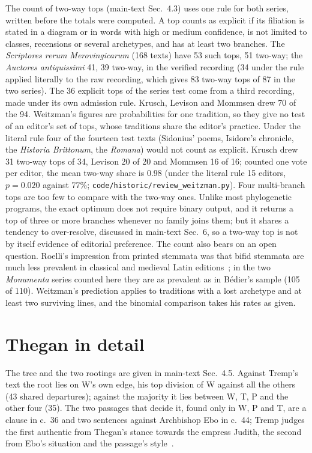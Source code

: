 \documentclass[11pt,a4paper]{article}
\theoremstyle{remark}
\begin{document}
The count of two-way tops (main-text Sec.~4.3) uses one rule for both series, written before the totals were computed. A top counts as explicit if its filiation is stated in a diagram or in words with high or medium confidence, is not limited to classes, recensions or several archetypes, and has at least two branches. The \emph{Scriptores rerum Merovingicarum} (168 texts) have 53 such tops, 51 two-way; the \emph{Auctores antiquissimi} 41, 39 two-way, in the verified recording (34 under the rule applied literally to the raw recording, which gives 83 two-way tops of 87 in the two series). The 36 explicit tops of the series test come from a third recording, made under its own admission rule. Krusch, Levison and Mommsen drew 70 of the 94. Weitzman's figures are probabilities for one tradition, so they give no test of an editor's set of tops, whose traditions share the editor's practice. Under the literal rule four of the fourteen test texts (Sidonius' poems, Isidore's chronicle, the \emph{Historia Brittonum}, the \emph{Romana}) would not count as explicit. Krusch drew 31 two-way tops of 34, Levison 20 of 20 and Mommsen 16 of 16; counted one vote per editor, the mean two-way share is 0.98 (under the literal rule 15 editors, $p=0.020$ against 77\%; \texttt{code/historic/review\_weitzman.py}). Four multi-branch tops are too few to compare with the two-way ones. Unlike most phylogenetic programs, the exact optimum does not require binary output, and it returns a top of three or more branches whenever no family joins them; but it shares a tendency to over-resolve, discussed in main-text Sec.~6, so a two-way top is not by itself evidence of editorial preference. The count also bears on an open question. Roelli's impression from printed stemmata was that bifid stemmata are much less prevalent in classical and medieval Latin editions~\citep[p.~218]{Roelli2020}; in the two \emph{Monumenta} series counted here they are as prevalent as in Bédier's sample (105 of 110). Weitzman's prediction applies to traditions with a lost archetype and at least two surviving lines, and the binomial comparison takes his rates as given.

\section{Thegan in detail}
\label{app:thegan}
The tree and the two rootings are given in main-text Sec.~4.5. Against Tremp's text the root lies on W's own edge, his top division of W against all the others (43 shared departures); against the majority it lies between W, T, P and the other four (35). The two passages that decide it, found only in W, P and T, are a clause in c.~36 and two sentences against Archbishop Ebo in c.~44; Tremp judges the first authentic from Thegan's stance towards the empress Judith, the second from Ebo's situation and the passage's style~\citep[pp.~42--43]{Tremp1995}.
\end{document}

